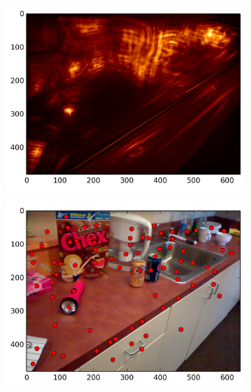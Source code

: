 \Needspace{0.8\textheight}
\begin{figure}[ht]
\centering
\begin{subfigure}[]{0.25\linewidth}\label{fig:kit_smag_0}\includegraphics[width=\linewidth]{figures/kitchen_smag_1}\end{subfigure}%
\begin{subfigure}[]{0.25\linewidth}\label{fig:kit_feats_0}\includegraphics[width=\linewidth]{figures/kitchen_feats_1}\end{subfigure}%

\end{figure}
